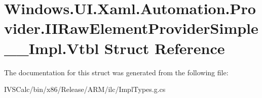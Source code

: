 \hypertarget{struct_windows_1_1_u_i_1_1_xaml_1_1_automation_1_1_provider_1_1_i_i_raw_element_provider_simple_____impl_1_1_vtbl}{}\section{Windows.\+U\+I.\+Xaml.\+Automation.\+Provider.\+I\+I\+Raw\+Element\+Provider\+Simple\+\_\+\+\_\+\+Impl.\+Vtbl Struct Reference}
\label{struct_windows_1_1_u_i_1_1_xaml_1_1_automation_1_1_provider_1_1_i_i_raw_element_provider_simple_____impl_1_1_vtbl}


The documentation for this struct was generated from the following file\+:\begin{DoxyCompactItemize}
\item 
I\+V\+S\+Calc/bin/x86/\+Release/\+A\+R\+M/ilc/Impl\+Types.\+g.\+cs\end{DoxyCompactItemize}
